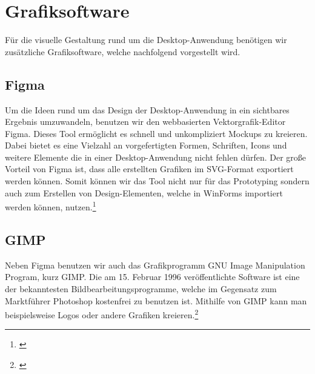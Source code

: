 \section{Grafiksoftware}

Für die visuelle Gestaltung rund um die Desktop-Anwendung benötigen wir zusätzliche Grafiksoftware, welche nachfolgend vorgestellt wird.

\subsection{Figma}

Um die Ideen rund um das Design der Desktop-Anwendung in ein sichtbares Ergebnis umzuwandeln, benutzen wir den webbasierten Vektorgrafik-Editor Figma. Dieses Tool ermöglicht es schnell und unkompliziert Mockups zu kreieren. Dabei bietet es eine Vielzahl an vorgefertigten Formen, Schriften, Icons und weitere Elemente die in einer Desktop-Anwendung nicht fehlen dürfen. Der große Vorteil von Figma ist, dass alle erstellten Grafiken im SVG-Format exportiert werden können. Somit können wir das Tool nicht nur für das Prototyping sondern auch zum Erstellen von Design-Elementen, welche in WinForms importiert werden können, nutzen.\footnote[3]{\cite[Vgl.][]{Figma}}

\subsection{GIMP}

Neben Figma benutzen wir auch das Grafikprogramm GNU Image Manipulation Program, kurz GIMP. Die am 15. Februar 1996 veröffentlichte Software ist eine der bekanntesten Bildbearbeitungsprogramme, welche im Gegensatz zum Marktführer Photoshop kostenfrei zu benutzen ist. Mithilfe von GIMP kann man beispielsweise Logos oder andere Grafiken kreieren.\footnote[1]{\cite[Vgl.][]{GIMP}}

